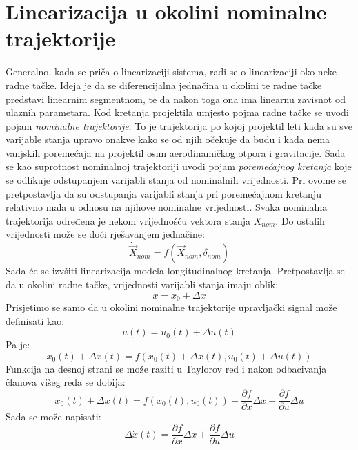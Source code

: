 \section{Linearizacija u okolini nominalne trajektorije}
Generalno, kada se priča o linearizaciji sistema, radi se o linearizaciji oko neke radne tačke. Ideja je 
da se diferencijalna jednačina u okolini te radne tačke predstavi linearnim segmentnom, te da 
nakon toga ona ima linearnu zavisnot od ulaznih parametara. Kod kretanja projektila umjesto pojma 
radne tačke se uvodi pojam \textit{nominalne trajektorije}. To je trajektorija po kojoj projektil 
leti kada su sve varijable stanja upravo onakve kako se od njih očekuje da budu i kada nema vanjskih poremećaja 
na projektil osim aerodinamičkog otpora i gravitacije. Sada se kao suprotnost nominalnoj trajektoriji 
uvodi pojam \textit{poremećajnog kretanja} koje se odlikuje odstupanjem varijabli stanja od nominalnih vrijednosti. 
Pri ovome se pretpostavlja da su odstupanja varijabli stanja pri poremećajnom kretanju relativno mala u odnosu na 
njihove nominalne vrijednosti. Svaka nominalna trajektorija određena je nekom vrijednošću vektora stanja $X_{nom}$.
Do ostalih vrijednosti može se doći rješavanjem jednačine:
\begin{equation}
    \dot{\vec{X}}_{nom} = f(\vec{X}_{nom}, \delta_{nom})
\end{equation}
Sada će se izvšiti linearizacija modela longitudinalnog kretanja. Pretpostavlja se da u okolini radne tačke, 
vrijednosti varijabli stanja imaju oblik:
\begin{equation}
    x=x_0+\Delta x 
\end{equation}
Prisjetimo se samo da u okolini nominalne trajektorije upravljački signal može definisati kao:
\begin{equation}
    u(t) = u_0(t)+\Delta u(t)
\end{equation}
Pa je:
\begin{equation}
    \dot{x}_0(t)+\Delta \dot{x}(t)=f(x_0(t)+\Delta x(t),u_0(t)+\Delta u(t))
\end{equation}
Funkcija na desnoj strani se može raziti u Taylorov red i nakon odbacivanja članova višeg reda
se dobija:
\begin{equation}
    \dot{x}_0(t)+\Delta \dot{x}(t)=f(x_0(t),u_0(t))+\frac{\partial f}{\partial x}\Delta x+\frac{\partial f}{\partial u}\Delta u
\end{equation}
Sada se može napisati:
\begin{equation}
    \Delta \dot{x}(t)=\frac{\partial f}{\partial x}\Delta x+\frac{\partial f}{\partial u}\Delta u
\end{equation}
